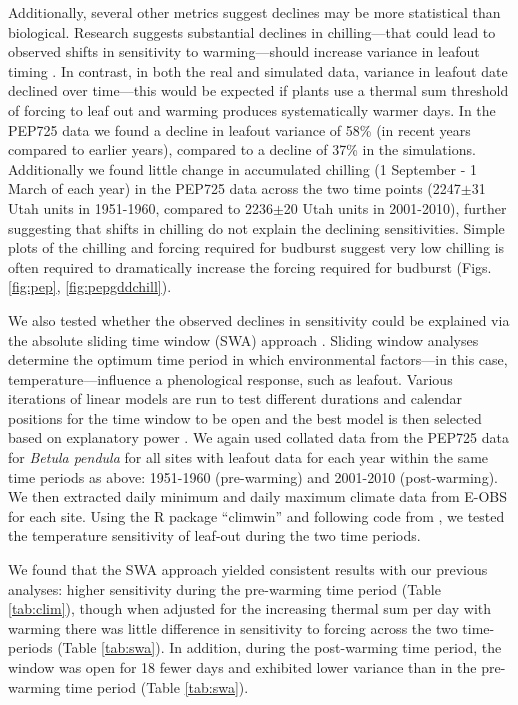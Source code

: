 \documentclass{article}
\begin{document}
\par Additionally, several other metrics suggest declines may be more statistical than biological. Research suggests substantial declines in chilling---that could lead to observed shifts in sensitivity to warming---should increase variance in leafout timing \emph{\citep{ford2016}}. In contrast, in both the real and simulated data, variance in leafout date declined over time---this would be expected if plants use a thermal sum threshold of forcing to leaf out and warming produces systematically warmer days. In the PEP725 data we found a decline in leafout variance of 58\% (in recent years compared to earlier years), compared to a decline of 37\% in the simulations. Additionally we found little change in accumulated chilling (1 September - 1 March of each year) in the PEP725 data across the two time points (2247$\pm$31 Utah units in 1951-1960, compared to 2236$\pm$20 Utah units in 2001-2010), further suggesting that shifts in chilling do not explain the declining sensitivities. Simple plots of the chilling and forcing required for budburst suggest very low chilling is often required to dramatically increase the forcing required for budburst (Figs. \ref{fig:pep}, \ref{fig:pepgddchill}). 
\par We also tested whether the observed declines in sensitivity could be explained via the absolute sliding time window (SWA) approach \emph{\citep{simmonds2019}}. Sliding window analyses determine the optimum time period in which environmental factors---in this case, temperature---influence a phenological response, such as leafout. Various iterations of linear models are run to test different durations and calendar positions for the time window to be open and the best model is then selected based on explanatory power \emph{\citep{simmonds2019, Bailey2016}}.  We again used collated data from the PEP725 data \emph{\citep{Templ2018}} for \emph{Betula pendula} for all sites with leafout data for each year within the same time periods as above: 1951-1960 (pre-warming) and 2001-2010 (post-warming). We then extracted daily minimum and daily maximum climate data from E-OBS \emph{\citep{cornes2018}} for each site. Using the R package ``climwin'' \emph{\citep{Bailey2016,vandepol2016}} and following code from \emph{\citep{simmonds2019}}, we tested the temperature sensitivity of leaf-out during the two time periods.  
\par We found that the SWA approach yielded consistent results with our previous analyses: higher sensitivity during the pre-warming time period (Table \ref{tab:clim}), though when adjusted for the increasing thermal sum per day with warming there was little difference in sensitivity to forcing across the two time-periods (Table \ref{tab:swa}). In addition, during the post-warming time period, the window was open for 18 fewer days and exhibited lower variance than in the pre-warming time period (Table \ref{tab:swa}). 
\end{document}
